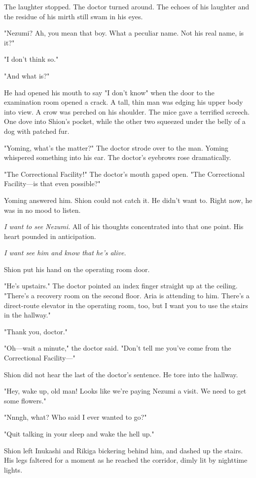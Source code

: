 The laughter stopped. The doctor turned around. The echoes of his
laughter and the residue of his mirth still swam in his eyes.

"Nezumi? Ah, you mean that boy. What a peculiar name. Not his real name,
is it?"

"I don't think so."

"And what is?"

He had opened his mouth to say "I don't know" when the door to the
examination room opened a crack. A tall, thin man was edging his upper
body into view. A crow was perched on his shoulder. The mice gave a
terrified screech. One dove into Shion's pocket, while the other two
squeezed under the belly of a dog with patched fur.

"Yoming, what's the matter?" The doctor strode over to the man. Yoming
whispered something into his ear. The doctor's eyebrows rose
dramatically.

"The Correctional Facility!" The doctor's mouth gaped open. "The
Correctional Facility---is that even possible?"

Yoming answered him. Shion could not catch it. He didn't want to. Right
now, he was in no mood to listen.

\emph{I want to see Nezumi.} All of his thoughts concentrated into that one
point. His heart pounded in anticipation.

\emph{I want see him and know that he's alive.}

Shion put his hand on the operating room door.

"He's upstairs." The doctor pointed an index finger straight up at the
ceiling. "There's a recovery room on the second floor. Aria is attending
to him. There's a direct-route elevator in the operating room, too, but
I want you to use the stairs in the hallway."

"Thank you, doctor."

"Oh---wait a minute," the doctor said. "Don't tell me you've come from the
Correctional Facility---"

Shion did not hear the last of the doctor's sentence. He tore into the
hallway.

"Hey, wake up, old man! Looks like we're paying Nezumi a visit. We need
to get some flowers."

"Nnngh, what? Who said I ever wanted to go?"

"Quit talking in your sleep and wake the hell up."

Shion left Inukashi and Rikiga bickering behind him, and dashed up the
stairs. His legs faltered for a moment as he reached the corridor, dimly
lit by nighttime lights.

